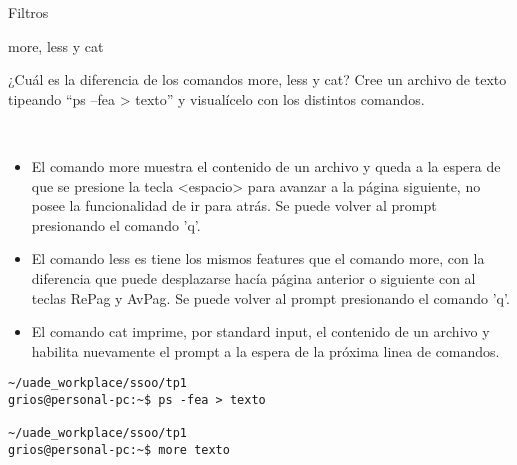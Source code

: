 \begin{section}{Filtros}

\begin{subsection}{more, less y cat}
\begin{quoting}
¿Cuál es la diferencia de los comandos more, less y cat? Cree un archivo de texto tipeando “ps –fea >
texto” y visualícelo con los distintos comandos.
\end{quoting}\\

\begin{itemize}
\item El comando more muestra el contenido de un archivo y queda a la espera de que se presione la tecla <espacio> para avanzar a la página siguiente, no posee la funcionalidad de ir para atrás. Se puede volver al prompt presionando el comando 'q'.

\item El comando less es tiene los mismos features que el comando more, con la diferencia que puede desplazarse hacía página anterior o siguiente con al teclas RePag y AvPag. Se puede volver al prompt presionando el comando 'q'.

\item El comando cat imprime, por standard input, el contenido de un archivo y habilita nuevamente el prompt a la espera de la próxima linea de comandos.
\end{itemize}

\begin{lstlisting}[style=Ubuntu]
~/uade_workplace/ssoo/tp1
grios@personal-pc:~$ ps -fea > texto

~/uade_workplace/ssoo/tp1
grios@personal-pc:~$ more texto


\end{lstlisting}
\end{subsection}
\end{section}
